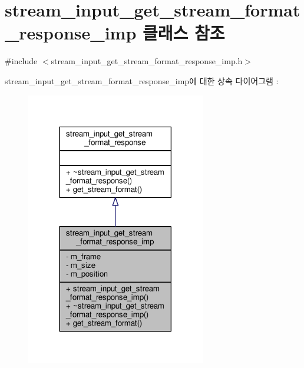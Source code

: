 \hypertarget{classavdecc__lib_1_1stream__input__get__stream__format__response__imp}{}\section{stream\+\_\+input\+\_\+get\+\_\+stream\+\_\+format\+\_\+response\+\_\+imp 클래스 참조}
\label{classavdecc__lib_1_1stream__input__get__stream__format__response__imp}


{\ttfamily \#include $<$stream\+\_\+input\+\_\+get\+\_\+stream\+\_\+format\+\_\+response\+\_\+imp.\+h$>$}



stream\+\_\+input\+\_\+get\+\_\+stream\+\_\+format\+\_\+response\+\_\+imp에 대한 상속 다이어그램 \+: 
\nopagebreak
\begin{figure}[H]
\begin{center}
\leavevmode
\includegraphics[width=222pt]{classavdecc__lib_1_1stream__input__get__stream__format__response__imp__inherit__graph}
\end{center}
\end{figure}


